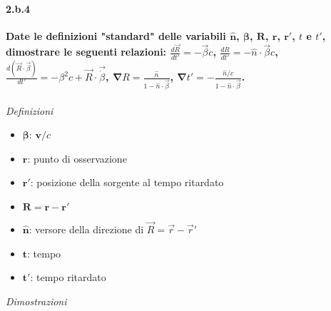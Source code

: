 \documentclass[twoside]{article}
\begin{document}
\paragraph{2.b.4}\textbf{Date le definizioni "standard" delle variabili $\mathbf{\hat{n}}$, $\bm{\beta}$, $\mathbf{R}$, $\mathbf{r}$, $\mathbf{r'}$, $t$ e $t'$, dimostrare le seguenti relazioni: $\frac{d\vec{R}}{dt'}=-\vec{\beta}c$, $\frac{dR}{dt'}=-\hat{n}\cdot\vec{\beta}c$, $\frac{d(\vec{R}\cdot\vec{\beta})}{dt'}=-\beta^2c+\vec{R}\cdot\vec{\dot{\beta}}$, $\mathbf{\nabla}R=\frac{\hat{n}}{1-\hat{n}\cdot\vec{\beta}}$, $\mathbf{\nabla}t'=-\frac{\hat{n}/c}{1-\hat{n}\cdot\vec{\beta}}$.}\\ 
\\
\textit{Definizioni}
\begin{itemize}
    \item $\bm{\beta}$: $\mathbf{v}/c$
    \item $\mathbf{r}$: punto di osservazione
    \item $\mathbf{r}'$: posizione della sorgente al tempo ritardato
    \item $\mathbf{R}=\mathbf{r}-\mathbf{r}'$
    \item $\mathbf{\hat{n}}$: versore della direzione di $\vec{R}=\vec{r}-\vec{r}'$
    \item $\mathbf{t}$: tempo
    \item $\mathbf{t}'$: tempo ritardato
\end{itemize}
\textit{Dimostrazioni}
\end{document}
